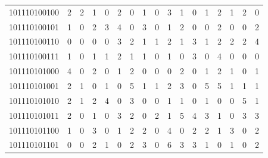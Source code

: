 \documentclass[10pt,a4paper]{article}
\begin{document}
\begin{longtable}{ |c|c|c|c|c|c|c|c|c|c|c|c|c|c|c|c|c| }
    101110100100              & 2                            & 2                                & 1                            & 0                              & 2   & 0   & 1   & 0   & 3   & 1   & 0   & 1   & 2   & 1   & 2   & 0   \\
    101110100101              & 1                            & 0                                & 2                            & 3                              & 4   & 0   & 3   & 0   & 1   & 2   & 0   & 0   & 2   & 0   & 0   & 2   \\
    101110100110              & 0                            & 0                                & 0                            & 0                              & 3   & 2   & 1   & 1   & 2   & 1   & 3   & 1   & 2   & 2   & 2   & 4   \\
    101110100111              & 1                            & 0                                & 1                            & 1                              & 2   & 1   & 1   & 0   & 1   & 0   & 3   & 0   & 4   & 0   & 0   & 0   \\
    101110101000              & 4                            & 0                                & 2                            & 0                              & 1   & 2   & 0   & 0   & 0   & 2   & 0   & 1   & 2   & 1   & 0   & 1   \\
    101110101001              & 2                            & 1                                & 0                            & 1                              & 0   & 5   & 1   & 1   & 2   & 3   & 0   & 5   & 5   & 1   & 1   & 1   \\
    101110101010              & 2                            & 1                                & 2                            & 4                              & 0   & 3   & 0   & 0   & 1   & 1   & 0   & 1   & 0   & 0   & 5   & 1   \\
    101110101011              & 2                            & 0                                & 1                            & 0                              & 3   & 2   & 0   & 2   & 1   & 5   & 4   & 3   & 1   & 0   & 3   & 3   \\
    101110101100              & 1                            & 0                                & 3                            & 0                              & 1   & 2   & 2   & 0   & 4   & 0   & 2   & 2   & 1   & 3   & 0   & 2   \\
    101110101101              & 0                            & 0                                & 2                            & 1                              & 0   & 2   & 3   & 0   & 6   & 3   & 3   & 1   & 0   & 1   & 0   & 2   \\

\end{longtable}
\end{document}
